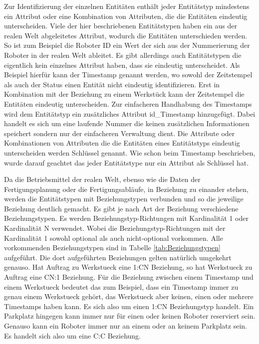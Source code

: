 Zur Identifizierung der einzelnen Entitäten enthält jeder Entitätstyp mindestens ein Attribut oder eine Kombination von Attributen, die die Entitäten eindeutig unterscheiden. Viele der hier beschriebenen Entitätstypen haben ein aus der realen Welt abgeleitetes Attribut, wodurch die Entitäten unterschieden werden. So ist zum Beispiel die Roboter ID ein Wert der sich aus der Nummerierung der Roboter in der realen Welt ableitet. Es gibt allerdings auch Entitätstypen die eigentlich kein einzelnes Attribut haben, dass sie eindeutig unterscheidet. Als Beispiel hierfür kann der Timestamp genannt werden, wo sowohl der Zeitstempel als auch der Status einen Entität nicht eindeutig identifizieren. Erst in Kombination mit der Beziehung zu einem Werkstück kann der Zeitstempel die Entitäten eindeutig unterscheiden. Zur einfacheren Handhabung des Timestamps wird dem Entitätstyp ein zusätzliches Attribut \glqq id\_Timestamp\grqq{}  hinzugefügt. Dabei handelt es sich um eine laufende Nummer die keinen zusätzlichen Informationen speichert sondern nur der einfacheren Verwaltung dient. Die Attribute oder Kombinationen von Attributen die die Entitäten eines Entitätstyps eindeutig unterscheiden werden Schlüssel genannt. Wie schon beim Timestamp beschrieben, wurde darauf geachtet das jeder Entitätstype nur ein Attribut als Schlüssel hat.
 
Da die Betriebsmittel der realen Welt, ebenso wie die Daten der Fertigungsplanung oder die Fertigungsabläufe, in Beziehung zu einander stehen, werden die Entitätstypen mit Beziehungstypen verbunden und so die jeweilige Beziehung deutlich gemacht. Es gibt je nach Art der Beziehung verschiedene Beziehungstypen. Es werden Beziehungstyp-Richtungen mit Kardinalität 1 oder Kardinalität N verwendet. Wobei die Beziehungstyp-Richtungen mit der Kardinalität 1 sowohl optional als auch nicht-optional vorkommen. Alle vorkommenden Beziehungstypen sind in Tabelle \ref{tab:Beziehungstypen} aufgeführt. Die dort aufgeführten Beziehungen gelten natürlich umgekehrt genauso. Hat Auftrag zu Werkstueck eine 1:CN Beziehung, so hat Werkstueck zu Auftrag eine CN:1 Beziehung. Für die Beziehung zwischen einem Timestamp und einem Werkstueck bedeutet das zum Beispiel, dass ein Timestamp immer zu genau einem Werkstueck gehört, das Werkstueck aber keinen, einen oder mehrere Timestamps haben kann. Es sich also um einen 1:CN Beziehungstyp handelt. Ein Parkplatz hingegen kann immer nur für einen oder keinen Roboter reserviert sein. Genauso kann ein Roboter immer nur an einem oder an keinem Parkplatz sein. Es handelt sich also um eine C:C Beziehung. 

